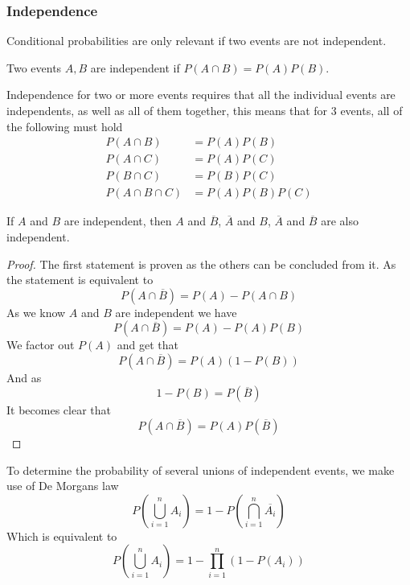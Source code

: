 \subsubsection{Independence}
Conditional probabilities are only relevant if two events are not independent.
\begin{definition}[Independence]
  Two events $A,B$ are independent if $P(A\cap B)=P(A)P(B)$.
\end{definition}
Independence for two or more events requires that all the individual events are independents, as well as all of them together, this means that for 3 events, all of the following must hold
\begin{align*}
    P(A\cap B)&=P(A)P(B) \\
    P(A\cap C)&=P(A)P(C) \\
    P(B\cap C)&=P(B)P(C) \\
    P(A\cap B\cap C)&=P(A)P(B)P(C)
\end{align*}
\begin{theorem}
    If $A$ and $B$ are independent, then $A$ and $\overline{B}$, $\overline{A}$ and $B$, $\overline{A}$ and $\overline{B}$ are also independent.
\end{theorem}
\begin{proof}
  The first statement is proven as the others can be concluded from it. As the statement is equivalent to
  \[
      P(A\cap \overline{B})=P(A)-P(A\cap B)
  \]
  As we know $A$ and $B$ are independent we have
  \[
      P(A\cap\overline{B})=P(A)-P(A)P(B)
  \]
  We factor out $P(A)$ and get that
  \[
      P(A\cap\overline{B})=P(A)(1-P(B))
  \]
  And as
  \[
      1-P(B)=P(\overline{B})
  \]
  It becomes clear that
  \[
      P(A\cap\overline{B})=P(A)P(\overline{B})
  \]
\end{proof}
To determine the probability of several unions of independent events, we make use of De Morgans law
\[
    P\left(\bigcup_{i=1}^{n} A_{i}\right)=1-P\left(\bigcap_{i=1}^{n} \overline{A_{i}}\right)
\]
Which is equivalent to
\[
    P\left(\bigcup_{i=1}^{n} A_{i}\right)=1-\prod_{i=1}^{n} (1-P(A_{i}))
\]
